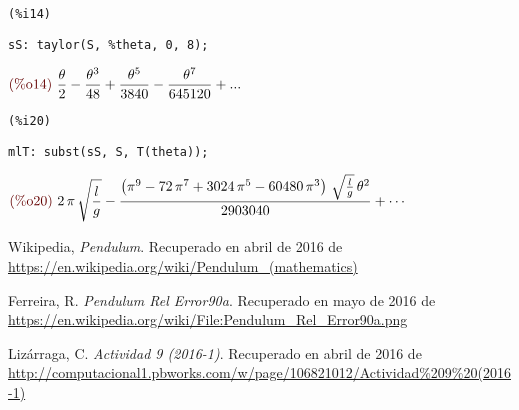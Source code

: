 \documentclass[12pt]{article}
\begin{document}
\noindent
\begin{minipage}[t]{8ex}{\color{red}\bf
\begin{verbatim}
(%i14) 
\end{verbatim}}
\end{minipage}
\begin{minipage}[t]{\textwidth}{\color{blue}
\begin{verbatim}
sS: taylor(S, %theta, 0, 8);
\end{verbatim}}
\end{minipage}
\begin{math}\displaystyle
\parbox{8ex}{\color{labelcolor}(\%o14)}
\frac{\theta}{2}-\frac{{\theta}^{3}}{48}+\frac{{\theta}^{5}}{3840}-\frac{{\theta}^{7}}{645120}+...
\end{math}

\noindent
\begin{minipage}[t]{8ex}{\color{red}\bf
\begin{verbatim}
(%i20) 
\end{verbatim}}
\end{minipage}
\begin{minipage}[t]{\textwidth}{\color{blue}
\begin{verbatim}
mlT: subst(sS, S, T(theta));
\end{verbatim}}
\end{minipage}
\begin{math}\displaystyle
\parbox{8ex}{\color{labelcolor}(\%o20)}
2\,\pi \,\sqrt{\frac{l}{g}}-\frac{\left( {\pi }^{9}-72\,{\pi }^{7}+3024\,{\pi }^{5}-60480\,{\pi }^{3}\right) \,\sqrt{\frac{l}{g}}\,{\theta}^{2}}{2903040}+\cdots
\end{math}

\begin{thebibliography}{6}

Wikipedia,
\emph{Pendulum}. Recuperado en abril de 2016 de \url{https://en.wikipedia.org/wiki/Pendulum\_(mathematics)}

Ferreira, R.
\emph{Pendulum Rel Error90a}. Recuperado en mayo de 2016 de \url{https://en.wikipedia.org/wiki/File:Pendulum_Rel_Error90a.png}

Lizárraga, C.
\emph{Actividad 9 (2016-1)}. Recuperado en abril de 2016 de \url{http://computacional1.pbworks.com/w/page/106821012/Actividad\%209\%20(2016-1)}

\end{thebibliography}
\end{document}

